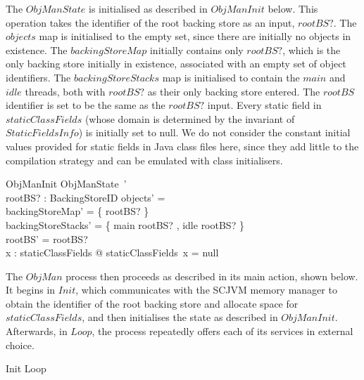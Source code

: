 The $ObjManState$ is initialised as described in $ObjManInit$ below.
This operation takes the identifier of the root backing store as an
input, $rootBS?$.
The $objects$ map is initialised to the empty set, since there are
initially no objects in existence.
The $backingStoreMap$ initially contains only $rootBS?$, which is the
only backing store initially in existence, associated with an empty
set of object identifiers.
The $backingStoreStacks$ map is initialised to contain the $main$ and
$idle$ threads, both with $rootBS?$ as their only backing store
entered.
The $rootBS$ identifier is set to be the same as the $rootBS?$ input.
Every static field in $staticClassFields$ (whose domain is determined
by the invariant of $StaticFieldsInfo$) is initially set to null.
We do not consider the constant initial values provided for static
fields in Java class files here, since they add little to the
compilation strategy and can be emulated with class initialisers.
\begin{schema}{ObjManInit}
	ObjManState~' \\
	rootBS? : BackingStoreID
\where
	objects' = \emptyset \\
	backingStoreMap' = \{ rootBS? \mapsto \emptyset \} \\
	backingStoreStacks' = \{ main \mapsto \langle rootBS? \rangle, idle \mapsto \langle rootBS? \rangle \} \\
	rootBS' = rootBS? \\
	\forall x : \dom staticClassFields @ staticClassFields~x = null
\end{schema}

The $ObjMan$ process then proceeds as described in its main action,
shown below.
It begins in $Init$, which communicates with the SCJVM memory manager
to obtain the identifier of the root backing store and allocate space
for $staticClassFields$, and then initialises the state as described
in $ObjManInit$.
Afterwards, in $Loop$, the process repeatedly offers each of its
services in external choice.
\begin{circusaction}
  \circspot Init \circseq Loop
\end{circusaction}


